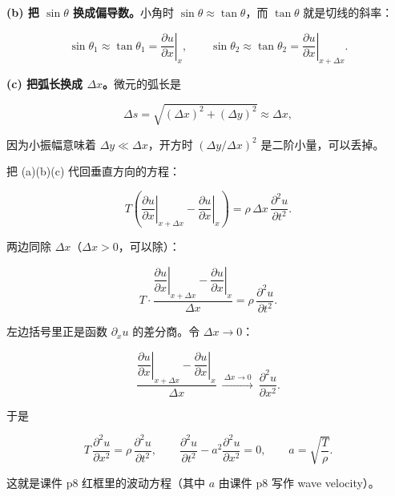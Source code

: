 \documentclass[11pt]{ctexart}
\let\origsubhdr\subhdr
\renewcommand{\subhdr}[1]{\par\needspace{3\baselineskip}\origsubhdr{#1}}
\begin{document}
\textbf{(b) 把 $\sin\theta$ 换成偏导数。}小角时 $\sin\theta\approx\tan\theta$，而 $\tan\theta$ 就是切线的斜率：

\[
\sin\theta_1\approx\tan\theta_1=\left.\frac{\partial u}{\partial x}\right|_{x},
\qquad
\sin\theta_2\approx\tan\theta_2=\left.\frac{\partial u}{\partial x}\right|_{x+\Delta x}.
\]

\textbf{(c) 把弧长换成 $\Delta x$。}微元的弧长是

\[
\Delta s=\sqrt{(\Delta x)^2+(\Delta y)^2}\approx\Delta x,
\]

因为小振幅意味着 $\Delta y\ll\Delta x$，开方时 $(\Delta y/\Delta x)^2$ 是二阶小量，可以丢掉。


把 (a)(b)(c) 代回垂直方向的方程：

\[
T\left(\left.\frac{\partial u}{\partial x}\right|_{x+\Delta x}
-\left.\frac{\partial u}{\partial x}\right|_{x}\right)
=\rho\,\Delta x\,\frac{\partial^2u}{\partial t^2}.
\]


两边同除 $\Delta x$（$\Delta x>0$，可以除）：

\[
T\cdot\frac{\left.\dfrac{\partial u}{\partial x}\right|_{x+\Delta x}-\left.\dfrac{\partial u}{\partial x}\right|_{x}}{\Delta x}
=\rho\,\frac{\partial^2u}{\partial t^2}.
\]

左边括号里正是函数 $\partial_x u$ 的差分商。令 $\Delta x\to0$：

\[
\frac{\left.\dfrac{\partial u}{\partial x}\right|_{x+\Delta x}-\left.\dfrac{\partial u}{\partial x}\right|_{x}}{\Delta x}
\ \xrightarrow{\ \Delta x\to0\ }\
\frac{\partial^2u}{\partial x^2}.
\]


于是

\[
T\,\frac{\partial^2u}{\partial x^2}=\rho\,\frac{\partial^2u}{\partial t^2},
\qquad
\frac{\partial^2u}{\partial t^2}-a^2\frac{\partial^2u}{\partial x^2}=0,
\qquad
a=\sqrt{\frac{T}{\rho}} .
\]

这就是课件 p8 红框里的波动方程（其中 $a$ 由课件 p8 写作 wave velocity）。
\end{document}
